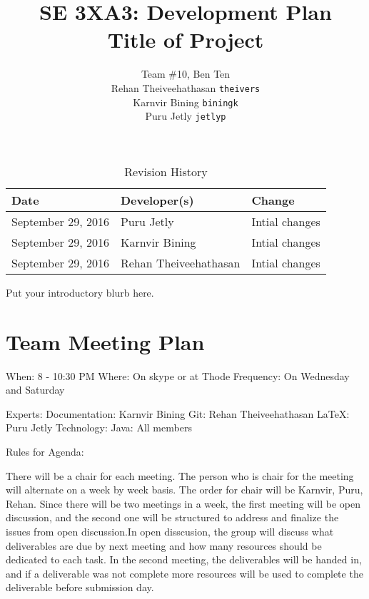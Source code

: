 \documentclass{article}
\title{SE 3XA3: Development Plan\\Title of Project}
\author{Team \#10, Ben Ten
		\\ Rehan Theiveehathasan	\texttt{theivers}
		\\ Karnvir Bining	\texttt{biningk}
		\\ Puru Jetly	\texttt{jetlyp}
}
\date{}
\begin{document}
\begin{table}[hp]
\caption{Revision History} \label{TblRevisionHistory}
\begin{tabularx}{\textwidth}{llX}
\toprule
\textbf{Date} & \textbf{Developer(s)} & \textbf{Change}\\
\midrule
September 29, 2016 & Puru Jetly & Intial changes\\
September 29, 2016 & Karnvir Bining & Intial changes\\
September 29, 2016 & Rehan Theiveehathasan & Intial changes\\
\bottomrule
\end{tabularx}
\end{table}
\newpage
\maketitle
Put your introductory blurb here.
\section{Team Meeting Plan}

When: 8 - 10:30 PM \newline
\newline
Where: On skype or at Thode\newline
\newline
Frequency: On Wednesday and Saturday\newline


\noindent Experts: \newline
\indent Documentation: Karnvir Bining\newline
\indent Git: Rehan Theiveehathasan\newline
\indent LaTeX: Puru Jetly\newline
\indent Technology: \newline
\indent  \indent Java: All members \newline

\noindent Rules for Agenda:\newline

\noindent There will be a chair for each meeting. The person who is chair for the meeting will alternate on a week by week basis. The order for chair will be Karnvir, Puru, Rehan. Since there will be two meetings in a week, the first meeting will be open discussion, and the second one will be structured to address and finalize the issues from open discussion.In open disscusion, the group will discuss what deliverables are due by next meeting  and how many resources should be dedicated to each task. In the second meeting, the deliverables will be handed in, and if a deliverable was not complete more resources will be used to complete the deliverable before submission day.
\end{document}
